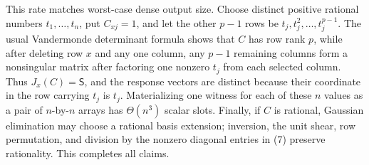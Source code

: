 This rate matches worst-case dense output size. Choose distinct positive rational numbers \(t_1,\ldots,t_n\), put \(C_{xj}=1\), and let the other \(p-1\) rows be \(t_j,t_j^2,\ldots,t_j^{p-1}\). The usual Vandermonde determinant formula shows that \(C\) has row rank \(p\), while after deleting row \(x\) and any one column, any \(p-1\) remaining columns form a nonsingular matrix after factoring one nonzero \(t_j\) from each selected column. Thus \(J_x(C)=\mathsf S\), and the response vectors are distinct because their coordinate in the row carrying \(t_j\) is \(t_j\). Materializing one witness for each of these \(n\) values as a pair of \(n\)-by-\(n\) arrays has \(\Theta(n^3)\) scalar slots. Finally, if \(C\) is rational, Gaussian elimination may choose a rational basis extension; inversion, the unit shear, row permutation, and division by the nonzero diagonal entries in (7) preserve rationality. This completes all claims.